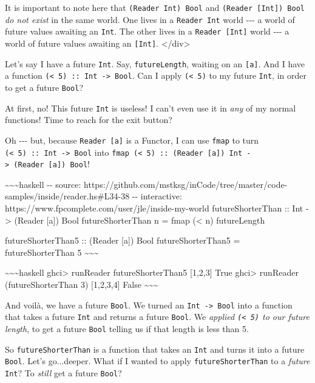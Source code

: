 \documentclass[]{article}
\begin{document}
It is important to note here that \texttt{(Reader\ Int)\ Bool} and
\texttt{(Reader\ {[}Int{]})\ Bool} \emph{do not exist} in the same world. One
lives in a \texttt{Reader\ Int} world -\/-\/- a world of future values awaiting
an \texttt{Int}. The other lives in a \texttt{Reader\ {[}Int{]}} world -\/-\/- a
world of future values awaiting an \texttt{{[}Int{]}}.
\textless{}/div\textgreater{}

Let's say I have a future \texttt{Int}. Say, \texttt{futureLength}, waiting on
an \texttt{{[}a{]}}. And I have a function
\texttt{(\textless{}\ 5)\ ::\ Int\ -\textgreater{}\ Bool}. Can I apply
\texttt{(\textless{}\ 5)} to my future \texttt{Int}, in order to get a future
\texttt{Bool}?

At first, no! This future \texttt{Int} is useless! I can't even use it in
\emph{any} of my normal functions! Time to reach for the exit button?

Oh -\/-\/- but, because \texttt{Reader\ {[}a{]}} is a Functor, I can use
\texttt{fmap} to turn \texttt{(\textless{}\ 5)\ ::\ Int\ -\textgreater{}\ Bool}
into
\texttt{fmap\ (\textless{}\ 5)\ ::\ (Reader\ {[}a{]})\ Int\ -\textgreater{}\ (Reader\ {[}a{]})\ Bool}!

\textasciitilde{}\textasciitilde{}\textasciitilde{}haskell -\/- source:
https://github.com/mstksg/inCode/tree/master/code-samples/inside/reader.hs\#L34-38
-\/- interactive: https://www.fpcomplete.com/user/jle/inside-my-world
futureShorterThan :: Int -\textgreater{} (Reader {[}a{]}) Bool futureShorterThan
n = fmap (\textless{} n) futureLength

futureShorterThan5 :: (Reader {[}a{]}) Bool futureShorterThan5 =
futureShorterThan 5 \textasciitilde{}\textasciitilde{}\textasciitilde{}

\textasciitilde{}\textasciitilde{}\textasciitilde{}haskell ghci\textgreater{}
runReader futureShorterThan5 {[}1,2,3{]} True ghci\textgreater{} runReader
(futureShorterThan 3) {[}1,2,3,4{]} False
\textasciitilde{}\textasciitilde{}\textasciitilde{}

And voilà, we have a future \texttt{Bool}. We turned an
\texttt{Int\ -\textgreater{}\ Bool} into a function that takes a future
\texttt{Int} and returns a future \texttt{Bool}. We \emph{applied
\texttt{(\textless{}\ 5)} to our future length}, to get a future \texttt{Bool}
telling us if that length is less than 5.

So \texttt{futureShorterThan} is a function that takes an \texttt{Int} and turns
it into a future \texttt{Bool}. Let's go...deeper. What if I wanted to apply
\texttt{futureShorterThan} to a \emph{future} \texttt{Int}? To \emph{still} get
a future \texttt{Bool}?
\end{document}
